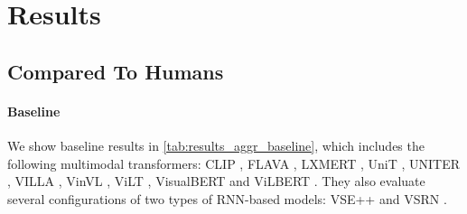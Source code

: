 
\section{Results} \label{sec:winoground_results}

\subsection{Compared To Humans}

\paragraph{Baseline}

We show baseline results in \cref{tab:results_aggr_baseline}, which includes the following multimodal transformers: CLIP \cite{radford2021clip}, FLAVA \cite{singh2022flava}, LXMERT \cite{tan2020lxmert}, UniT \cite{hu2021unit}, UNITER \cite{chen2020uniter}, VILLA \cite{gan2020villa}, VinVL \cite{zhang2021vinvl}, ViLT \cite{kim2021vilt}, VisualBERT \cite{li2019visualbert} and ViLBERT \cite{lu2019vilbert}. They also evaluate several configurations of two types of RNN-based models: VSE++ \cite{faghri2018vse} and VSRN \cite{li2019vsrn}.

